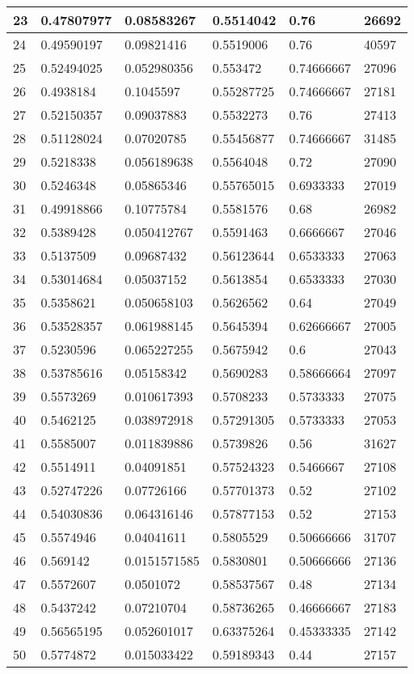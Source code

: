 \begin{longtable}{|l|l|l|l|l|l|}
23 & 0.47807977 & 0.08583267 & 0.5514042 & 0.76 & 26692 \\ \hline 
24 & 0.49590197 & 0.09821416 & 0.5519006 & 0.76 & 40597 \\ \hline 
25 & 0.52494025 & 0.052980356 & 0.553472 & 0.74666667 & 27096 \\ \hline 
26 & 0.4938184 & 0.1045597 & 0.55287725 & 0.74666667 & 27181 \\ \hline 
27 & 0.52150357 & 0.09037883 & 0.5532273 & 0.76 & 27413 \\ \hline 
28 & 0.51128024 & 0.07020785 & 0.55456877 & 0.74666667 & 31485 \\ \hline 
29 & 0.5218338 & 0.056189638 & 0.5564048 & 0.72 & 27090 \\ \hline 
30 & 0.5246348 & 0.05865346 & 0.55765015 & 0.6933333 & 27019 \\ \hline 
31 & 0.49918866 & 0.10775784 & 0.5581576 & 0.68 & 26982 \\ \hline 
32 & 0.5389428 & 0.050412767 & 0.5591463 & 0.6666667 & 27046 \\ \hline 
33 & 0.5137509 & 0.09687432 & 0.56123644 & 0.6533333 & 27063 \\ \hline 
34 & 0.53014684 & 0.05037152 & 0.5613854 & 0.6533333 & 27030 \\ \hline 
35 & 0.5358621 & 0.050658103 & 0.5626562 & 0.64 & 27049 \\ \hline 
36 & 0.53528357 & 0.061988145 & 0.5645394 & 0.62666667 & 27005 \\ \hline 
37 & 0.5230596 & 0.065227255 & 0.5675942 & 0.6 & 27043 \\ \hline 
38 & 0.53785616 & 0.05158342 & 0.5690283 & 0.58666664 & 27097 \\ \hline 
39 & 0.5573269 & 0.010617393 & 0.5708233 & 0.5733333 & 27075 \\ \hline 
40 & 0.5462125 & 0.038972918 & 0.57291305 & 0.5733333 & 27053 \\ \hline 
41 & 0.5585007 & 0.011839886 & 0.5739826 & 0.56 & 31627 \\ \hline 
42 & 0.5514911 & 0.04091851 & 0.57524323 & 0.5466667 & 27108 \\ \hline 
43 & 0.52747226 & 0.07726166 & 0.57701373 & 0.52 & 27102 \\ \hline 
44 & 0.54030836 & 0.064316146 & 0.57877153 & 0.52 & 27153 \\ \hline 
45 & 0.5574946 & 0.04041611 & 0.5805529 & 0.50666666 & 31707 \\ \hline 
46 & 0.569142 & 0.0151571585 & 0.5830801 & 0.50666666 & 27136 \\ \hline 
47 & 0.5572607 & 0.0501072 & 0.58537567 & 0.48 & 27134 \\ \hline 
48 & 0.5437242 & 0.07210704 & 0.58736265 & 0.46666667 & 27183 \\ \hline 
49 & 0.56565195 & 0.052601017 & 0.63375264 & 0.45333335 & 27142 \\ \hline 
50 & 0.5774872 & 0.015033422 & 0.59189343 & 0.44 & 27157 \\ \hline 
\end{longtable}